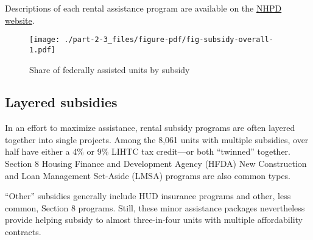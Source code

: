 \documentclass[
  letterpaper,
  DIV=11,
  numbers=noendperiod]{scrreprt}
\begin{document}
\begin{tcolorbox}[enhanced jigsaw, colback=white, colbacktitle=quarto-callout-note-color!10!white, bottomrule=.15mm, opacitybacktitle=0.6, colframe=quarto-callout-note-color-frame, breakable, opacityback=0, bottomtitle=1mm, titlerule=0mm, coltitle=black, leftrule=.75mm, left=2mm, title=\textcolor{quarto-callout-note-color}{\faInfo}\hspace{0.5em}{Note}, toptitle=1mm, arc=.35mm, rightrule=.15mm, toprule=.15mm]
Descriptions of each rental assistance program are available on the
\href{https://preservationdatabase.org/documentation/program-descriptions/}{NHPD
website}.
\end{tcolorbox}

\begin{figure}

{\centering \texttt{[image: ./part-2-3\_files/figure-pdf/fig-subsidy-overall-1.pdf]}

}

\caption{\label{fig-subsidy-overall}Share of federally assisted units by
subsidy}

\end{figure}

\hypertarget{layered-subsidies}{%
\subsection{Layered subsidies}\label{layered-subsidies}}

In an effort to maximize assistance, rental subsidy programs are often
layered together into single projects. Among the 8,061 units with
multiple subsidies, over half have either a 4\% or 9\% LIHTC tax
credit---or both ``twinned'' together. Section 8 Housing Finance and
Development Agency (HFDA) New Construction and Loan Management Set-Aside
(LMSA) programs are also common types.

``Other'' subsidies generally include HUD insurance programs and other,
less common, Section 8 programs. Still, these minor assistance packages
nevertheless provide helping subsidy to almost three-in-four units with
multiple affordability contracts.
\end{document}
